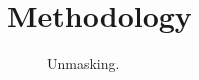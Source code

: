 \section{Methodology}
\label{sec:methodology}


\begin{figure}[htbp]
    \centering
    
    \caption{Unmasking.}
    \label{fig:unmasking}
\end{figure}